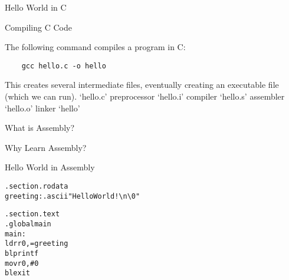 

\begin{frame}{Hello World in C}
\end{frame}


\begin{frame}[fragile]{Compiling C Code}

	The following command compiles a program in C:

	\begin{verbatim}
    gcc hello.c -o hello
\end{verbatim}

	This creates several intermediate files, eventually creating an executable file (which we can run).
	`hello.c'
	preprocessor
	`hello.i'
	compiler
	`hello.s'
	assembler
	`hello.o'
	linker
	`hello'

\end{frame}

\begin{frame}{What is Assembly?}
\end{frame}


\begin{frame}{Why Learn Assembly?}
\end{frame}


\begin{frame}[fragile]{Hello World in Assembly}
	\begin{alltt}
		.section .rodata
		greeting: .ascii "Hello World!{\textbackslash}n{\textbackslash}0"

		.section .text
		.global main
		main:
		ldr r0, =greeting
		bl printf
		mov r0, \#0
		bl exit
	\end{alltt}
\end{frame}


